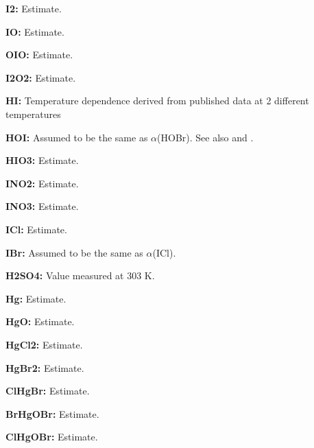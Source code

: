 \item {\bf  I2:} Estimate.
\item {\bf  IO:} Estimate.
\item {\bf  OIO:} Estimate.
\item {\bf  I2O2:} Estimate.
\item {\bf  HI:} Temperature dependence derived from published data at 2 different temperatures
\item {\bf  HOI:} Assumed to be the same as $\alpha $(HOBr). See also \citet  {1565} and \citet  {1572}.
\item {\bf  HIO3:} Estimate.
\item {\bf  INO2:} Estimate.
\item {\bf  INO3:} Estimate.
\item {\bf  ICl:} Estimate.
\item {\bf  IBr:} Assumed to be the same as $\alpha $(ICl).
\item {\bf  H2SO4:} Value measured at 303 \unit  {K}.
\item {\bf  Hg:} Estimate.
\item {\bf  HgO:} Estimate.
\item {\bf  HgCl2:} Estimate.
\item {\bf  HgBr2:} Estimate.
\item {\bf  ClHgBr:} Estimate.
\item {\bf  BrHgOBr:} Estimate.
\item {\bf  ClHgOBr:} Estimate.
